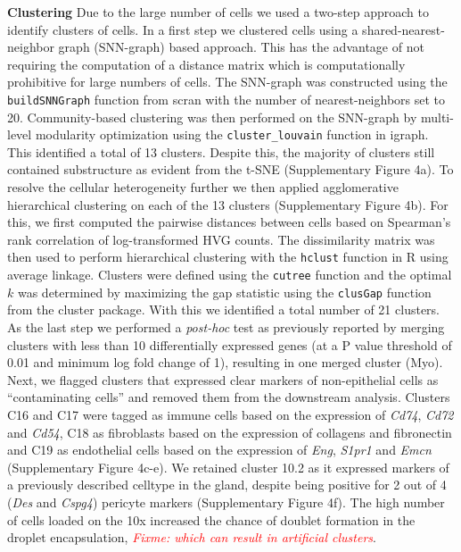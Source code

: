 \documentclass[titlepage, 12pt, oneside]{amsart}
\newcommand{\fixme}[1]{\textit{\textcolor{red}{Fixme: #1}}}
\begin{document}
\textbf{Clustering}
Due to the large number of cells we used a two-step approach to identify clusters of cells.
In a first step we clustered cells using a shared-nearest-neighbor graph (SNN-graph) based approach.
This has the advantage of not requiring the computation of a distance matrix which is computationally prohibitive for large numbers of cells.
The SNN-graph was constructed using the \texttt{buildSNNGraph} function from scran with the number of nearest-neighbors set to 20.
Community-based clustering was then performed on the SNN-graph by multi-level modularity optimization using the \texttt{cluster\_louvain} function in igraph\autocite{Csardi2006}.
This identified a total of 13 clusters.
Despite this, the majority of clusters still contained substructure as evident from the t-SNE (Supplementary Figure 4a).
To resolve the cellular heterogeneity further we then applied agglomerative hierarchical clustering on each of the 13 clusters (Supplementary Figure 4b).
For this, we first computed the pairwise distances between cells based on Spearman's rank correlation of log-transformed HVG counts.
The dissimilarity matrix was then used to perform hierarchical clustering with the \texttt{hclust} function in R using average linkage.
Clusters were defined using the \texttt{cutree} function and the optimal $k$ was determined by maximizing the gap statistic using the \texttt{clusGap} function from the cluster package\autocite{Maechler2017}.
With this we identified a total number of 21 clusters.
As the last step we performed a \textit{post-hoc} test as previously reported\autocite{Macosko2015} by merging clusters with less than 10 differentially expressed genes (at a P value threshold of 0.01 and minimum log fold change of 1), resulting in one merged cluster (Myo). 
Next, we flagged clusters that expressed clear markers of non-epithelial cells as ``contaminating cells'' and removed them from the downstream analysis.
Clusters C16 and C17 were tagged as immune cells based on the expression of \textit{Cd74}, \textit{Cd72} and \textit{Cd54}\autocite{Scheele2017}, C18 as fibroblasts based on the expression of collagens and fibronectin and C19 as endothelial cells based on the expression of \textit{Eng}, \textit{S1pr1} and \textit{Emcn} (Supplementary Figure 4c-e).
We retained cluster 10.2 as it expressed markers of a previously described celltype in the gland\autocite{Wang2015}, despite being positive for 2 out of 4 (\textit{Des} and \textit{Cspg4}) pericyte markers\autocite{Armulik2011} (Supplementary Figure 4f).
The high number of cells loaded on the 10x increased the chance of doublet formation in the droplet encapsulation\autocite{Zheng2017}, \fixme{which can result in artificial clusters}.
\end{document}
